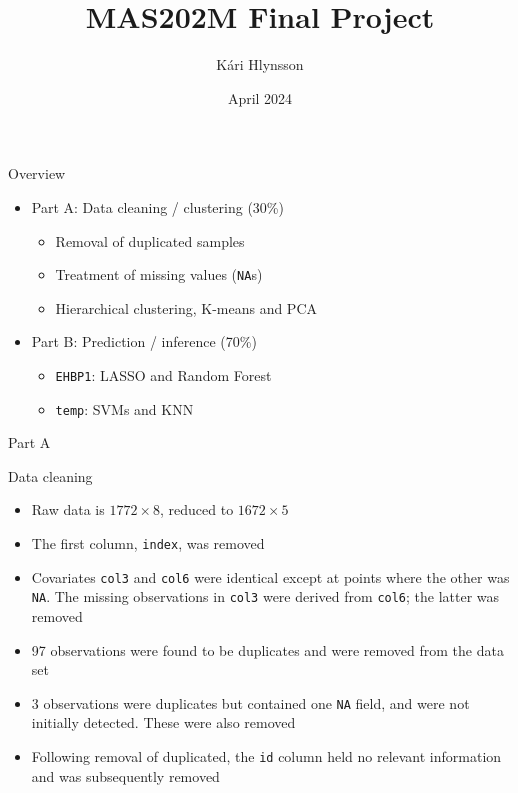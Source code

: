 \documentclass{beamer}
\title{MAS202M Final Project}
\author{Kári Hlynsson}
\institute{University of Iceland}
\date{April 2024}
\let\OldTexttt\texttt
\renewcommand{\texttt}[1]{\OldTexttt{{\textcolor{islrred}{#1}}}}
\begin{document}
\begin{frame}
  \titlepage 
\end{frame}

\begin{frame}{Overview}
  \begin{itemize}
    \setlength{\itemsep}{1em}
    \item Part A: Data cleaning / clustering (30\%) 
      \begin{itemize}
        \item Removal of duplicated samples
        \item Treatment of missing values (\texttt{NA}s)
        \item Hierarchical clustering, K-means and PCA
      \end{itemize}
    \item Part B: Prediction / inference (70\%)
      \begin{itemize}
        \item \texttt{EHBP1}: LASSO and Random Forest
        \item \texttt{temp}: SVMs and KNN
      \end{itemize}
  \end{itemize}
\end{frame}

\begin{frame}
  \centering
  \Large
  \textcolor{islrblue}{Part A}
\end{frame}

\begin{frame}{Data cleaning}
  \begin{itemize}
    \item Raw data is \(1772 \times 8\), reduced to \(1672 \times 5\)
    \item The first column, \texttt{index}, was removed
    \item Covariates \texttt{col3} and \texttt{col6} were identical except
      at points where the other was \texttt{NA}. The missing observations in 
      \texttt{col3} were derived from \texttt{col6}; the latter was removed
    \item 97 observations were found to be duplicates and were removed from the
      data set
    \item 3 observations were duplicates but contained one \texttt{NA} field,
      and were not initially detected. These were also removed
    \item Following removal of duplicated, the \texttt{id} column held no
      relevant information and was subsequently removed
  \end{itemize}
\end{frame}
\end{document}

